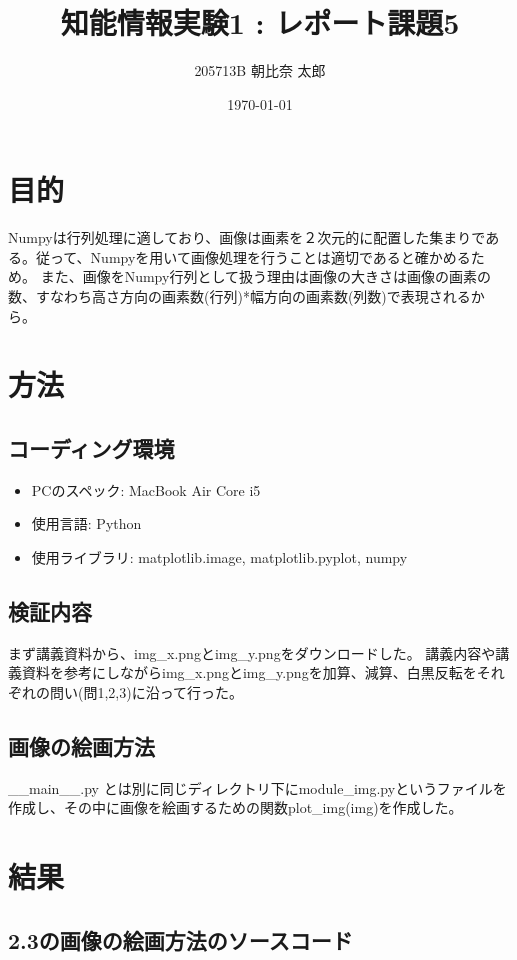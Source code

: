\documentclass[a4paper, 11pt, titlepage]{jsarticle}
\title {知能情報実験1 : レポート課題5}
\author{205713B  朝比奈 太郎}
\date{\today }
\begin{document}
\maketitle
\tableofcontents
\clearpage

\section{目的}
Numpyは行列処理に適しており、画像は画素を２次元的に配置した集まりである。従って、Numpyを用いて画像処理を行うことは適切であると確かめるため。
また、画像をNumpy行列として扱う理由は画像の大きさは画像の画素の数、すなわち高さ方向の画素数(行列)*幅方向の画素数(列数)で表現されるから。
\section{方法}
\subsection{コーディング環境}
\begin{itemize}
\item PCのスペック: MacBook Air Core i5
\item 使用言語: Python
\item 使用ライブラリ: matplotlib.image, matplotlib.pyplot, numpy
\end{itemize}
\subsection{検証内容}
まず講義資料から、img\_x.pngとimg\_y.pngをダウンロードした。
講義内容や講義資料を参考にしながらimg\_x.pngとimg\_y.pngを加算、減算、白黒反転をそれぞれの問い(問1,2,3)に沿って行った。
\subsection{画像の絵画方法}
\_\_main\_\_.py とは別に同じディレクトリ下にmodule\_img.pyというファイルを作成し、その中に画像を絵画するための関数plot\_img(img)を作成した。
\clearpage
\section{結果}
\subsection{2.3の画像の絵画方法のソースコード}

\end{document}
